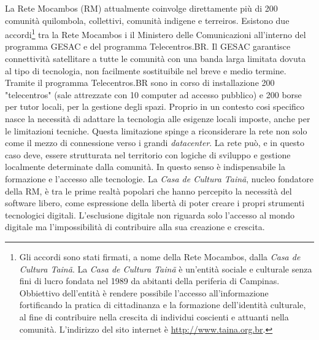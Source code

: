 La Rete Mocambos (RM) attualmente coinvolge direttamente più di 200
comunità quilombola, collettivi, comunità indigene e
terreiros. Esistono due accordi\footnote{Gli accordi sono stati
  firmati, a nome della Rete Mocambos, dalla \emph{Casa de Cultura
    Tainã}. La \emph{Casa de Cultura Tainã} è un'entità sociale e
  culturale senza fini di lucro fondata nel 1989 da abitanti della
  periferia di Campinas. Obbiettivo dell'entità è rendere possibile
  l'accesso all'informazione fortificando la pratica di cittadinanza e
  la formazione dell'identità culturale, al fine di contribuire nella
  crescita di individui coscienti e attuanti nella
  comunità. L'indirizzo del sito internet è
  \url{http://www.taina.org.br}.} tra la Rete Mocambos i il Ministero
delle Comunicazioni all'interno del programma GESAC e del programma
Telecentros.BR. Il GESAC garantisce connettività satellitare a tutte
le comunità con una banda larga limitata dovuta al tipo di tecnologia,
non facilmente sostituibile nel breve e medio termine. Tramite il
programma Telecentros.BR sono in corso di installazione 200
"telecentros" (sale attrezzate con 10 computer ad accesso pubblico) e
200 borse per tutor locali, per la gestione degli spazi. Proprio in un
contesto cosi specifico nasce la necessità di adattare la tecnologia
alle esigenze locali imposte, anche per le limitazioni
tecniche. Questa limitazione spinge a riconsiderare la rete non solo
come il mezzo di connessione verso i grandi \emph{datacenter}. La rete
può, e in questo caso deve, essere strutturata nel territorio con
logiche di sviluppo e gestione localmente determinate dalla
comunità. In questo senso è indispensabile la formazione e l'accesso
alle tecnologie. La \emph{Casa de Cultura Tainã}, nucleo fondatore
della RM, è tra le prime realtà popolari che hanno percepito la
necessità del software libero, come espressione della libertà di poter
creare i propri strumenti tecnologici digitali. L'esclusione digitale
non riguarda solo l'accesso al mondo digitale ma l'impossibilità di
contribuire alla sua creazione e crescita.

